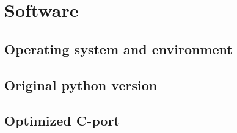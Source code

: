
\section{Software}
\subsection{Operating system and environment}
\subsection{Original python version}
\subsection{Optimized C-port}

